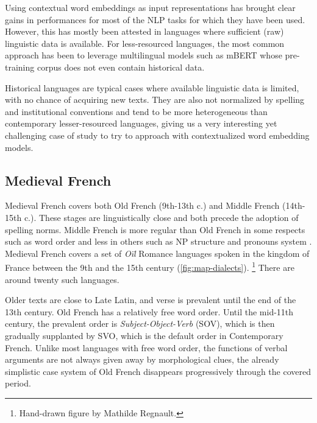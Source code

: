 Using contextual word embeddings as input representations has brought clear gains in performances for most of the NLP tasks for which they have been used. However, this has mostly been attested in languages where sufficient (raw) linguistic data is available. For less-resourced languages, the most common approach has been to leverage multilingual models such as mBERT \citep{devlin-etal-2019-bert} whose pre-training corpus does not even contain historical data.

Historical languages are typical cases where available linguistic data is limited, with no chance of acquiring new texts. They are also not normalized by spelling and institutional conventions and tend to be more heterogeneous than contemporary lesser-resourced languages, giving us a very interesting yet challenging case of study to try to approach with contextualized word embedding models.

\subsection{Medieval French}

Medieval French covers both Old French (9th-13th c.) and Middle French (14th-15th c.). These stages are linguistically close and both precede the adoption of spelling norms. Middle French is more regular than Old French in some respects such as word order \citep{marchello-Nizia-etal-2020-grande} and less in others such as NP structure and pronouns system \citep{marchello-nizia-etal-1979-histoire}. Medieval French covers a set of \textit{Oïl} Romance languages spoken in the kingdom of France between the 9th and the 15th century (\cref{fig:map-dialects}). \footnote{Hand-drawn figure by Mathilde Regnault.} There are around twenty such languages.

Older texts are close to Late Latin, and verse is prevalent until the end of the 13th century. Old French has a relatively free word order. Until the mid-11th century, the prevalent order is \textit{Subject-Object-Verb} (SOV), which is then gradually supplanted by SVO, which is the default order in Contemporary French. Unlike most languages with free word order, the functions of verbal arguments are not always given away by morphological clues, the already simplistic case system of Old French disappears progressively through the covered period.

